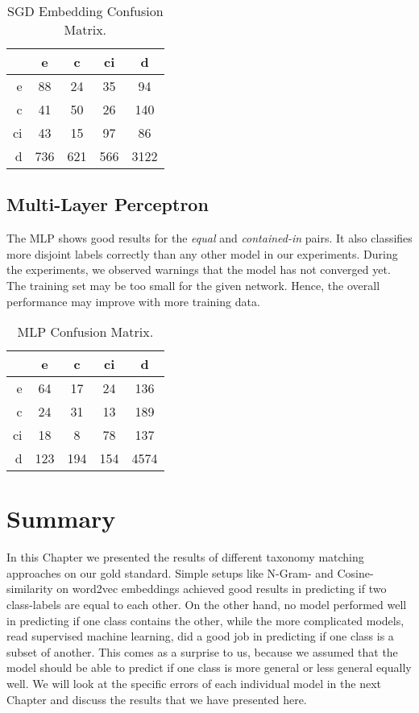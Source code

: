 \begin{table}[htbp]
 \begin{center}
  \begin{tabular}{r|cccc}
   & e & c & ci & d \\
   \hline
   e & 88 & 24 & 35 & 94 \\
   c & 41 & 50 & 26 & 140 \\
   ci & 43 & 15 & 97 & 86 \\
   d & 736 & 621 & 566 & 3122 \\
  \end{tabular}
  \caption{SGD Embedding Confusion Matrix.}
  \label{tab:sgd-emb-cm}
 \end{center}
\end{table}

\subsection{Multi-Layer Perceptron}

The MLP shows good results for the \emph{equal} and \emph{contained-in} pairs.
It also classifies more disjoint labels correctly than any other model in our experiments.
During the experiments, we observed warnings that the model has not converged yet.
The training set may be too small for the given network.
Hence, the overall performance may improve with more training data.

\begin{table}[htbp]
 \begin{center}
  \begin{tabular}{r|cccc}
   & e & c & ci & d \\
   \hline
   e & 64 & 17 & 24 & 136 \\
   c & 24 & 31 & 13 & 189 \\
   ci & 18 & 8 & 78 & 137 \\
   d & 123 & 194 & 154 & 4574 \\
  \end{tabular}
  \caption{MLP Confusion Matrix.}
  \label{tab:mlp-cm}
 \end{center}
\end{table}

\section{Summary}

In this Chapter we presented the results of different taxonomy matching approaches on our gold standard.
Simple setups like N-Gram- and Cosine-similarity on word2vec embeddings achieved good results in predicting
if two class-labels are equal to each other.
On the other hand, no model performed well in predicting if one class contains the other, while the more complicated models,
read supervised machine learning, did a good job in predicting if one class is a subset of another.
This comes as a surprise to us, because we assumed that the model should be able to predict if one class is more general or
less general equally well.
We will look at the specific errors of each individual model in the next Chapter and discuss the results that we have
presented here.
